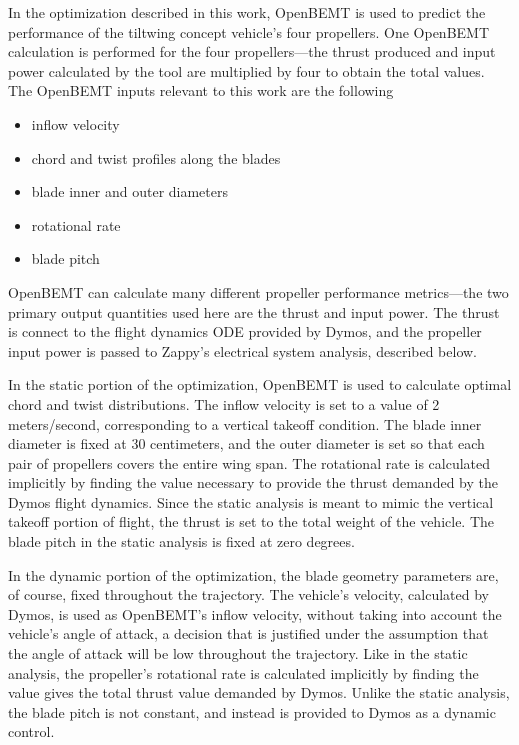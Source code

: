 In the optimization described in this work, OpenBEMT is used to predict the performance of the tiltwing concept vehicle's four propellers.
One OpenBEMT calculation is performed for the four propellers---the thrust produced and input power calculated by the tool are multiplied by four to obtain the total values.
The OpenBEMT inputs relevant to this work are the following
\begin{itemize}
  \item inflow velocity
  \item chord and twist profiles along the blades
  \item blade inner and outer diameters
  \item rotational rate
  \item blade pitch  %
\end{itemize}
OpenBEMT can calculate many different propeller performance metrics---the two primary output quantities used here are the thrust and input power.
The thrust is connect to the flight dynamics ODE provided by Dymos, and the propeller input power is passed to Zappy's electrical system analysis, described below.

In the static portion of the optimization, OpenBEMT is used to calculate optimal chord and twist distributions.
The inflow velocity is set to a value of 2 meters/second, corresponding to a vertical takeoff condition.
The blade inner diameter is fixed at 30 centimeters, and the outer diameter is set so that each pair of propellers covers the entire wing span.
The rotational rate is calculated implicitly by finding the value necessary to provide the thrust demanded by the Dymos flight dynamics.
Since the static analysis is meant to mimic the vertical takeoff portion of flight, the thrust is set to the total weight of the vehicle.
The blade pitch in the static analysis is fixed at zero degrees.

In the dynamic portion of the optimization, the blade geometry parameters are, of course, fixed throughout the trajectory.
The vehicle's velocity, calculated by Dymos, is used as OpenBEMT's inflow velocity, without taking into account the vehicle's angle of attack, a decision that is justified under the assumption that the angle of attack will be low throughout the trajectory.
Like in the static analysis, the propeller's rotational rate is calculated implicitly by finding the value gives the total thrust value demanded by Dymos.
Unlike the static analysis, the blade pitch is not constant, and instead is provided to Dymos as a dynamic control.  %

